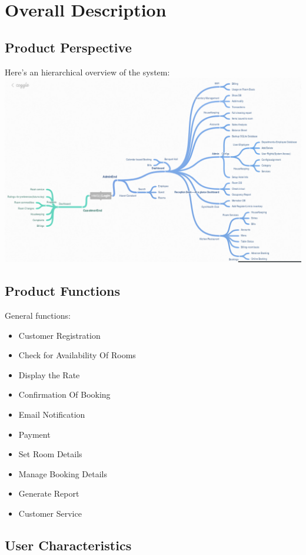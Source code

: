 \documentclass{scrreprt}
\begin{document}
\chapter{Overall Description}

\section{Product Perspective}
Here's an hierarchical overview of the system: \\
\includegraphics[scale=0.45]{mindMap}

\section{Product Functions}
General functions:
\begin{itemize}
\item Customer Registration
\item Check for Availability Of Rooms
\item Display the Rate
\item Confirmation Of Booking
\item Email Notification
\item Payment
\item Set Room Details
\item Manage Booking Details
\item Generate Report
\item Customer Service
\end{itemize}

\section{User Characteristics}
\end{document}
